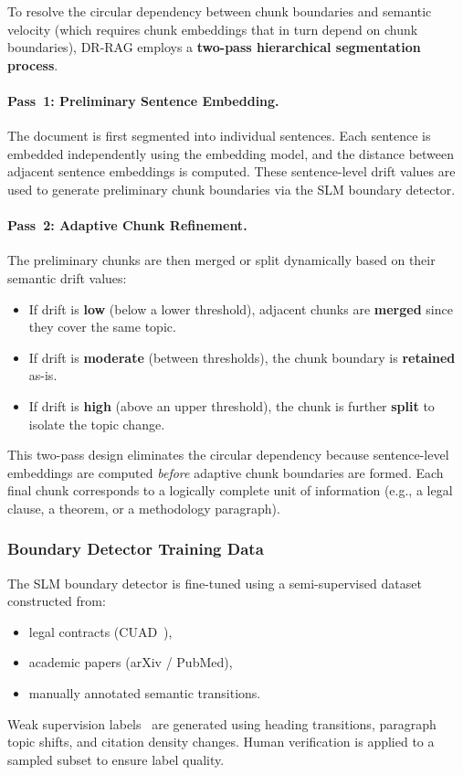 \documentclass[12pt,a4paper]{article}
\begin{document}
To resolve the circular dependency between chunk boundaries and semantic
velocity (which requires chunk embeddings that in turn depend on chunk
boundaries), DR-RAG employs a \textbf{two-pass hierarchical segmentation
process}.

\paragraph{Pass~1: Preliminary Sentence Embedding.}
The document is first segmented into individual sentences. Each sentence is
embedded independently using the embedding model, and the distance between
adjacent sentence embeddings is computed. These sentence-level drift values
are used to generate preliminary chunk boundaries via the SLM boundary
detector.

\paragraph{Pass~2: Adaptive Chunk Refinement.}
The preliminary chunks are then merged or split dynamically based on their
semantic drift values:
\begin{itemize}
  \item If drift is \textbf{low} (below a lower threshold), adjacent chunks
    are \textbf{merged} since they cover the same topic.
  \item If drift is \textbf{moderate} (between thresholds), the chunk
    boundary is \textbf{retained} as-is.
  \item If drift is \textbf{high} (above an upper threshold), the chunk is
    further \textbf{split} to isolate the topic change.
\end{itemize}
This two-pass design eliminates the circular dependency because sentence-level
embeddings are computed \emph{before} adaptive chunk boundaries are formed.
Each final chunk corresponds to a logically complete unit of information
(e.g., a legal clause, a theorem, or a methodology paragraph).

\subsubsection{Boundary Detector Training Data}

The SLM boundary detector is fine-tuned using a semi-supervised dataset
constructed from:
\begin{itemize}
  \item legal contracts (CUAD~\cite{hendrycks2021cuad}),
  \item academic papers (arXiv / PubMed),
  \item manually annotated semantic transitions.
\end{itemize}
Weak supervision labels~\cite{ratner2017snorkel} are generated using heading
transitions, paragraph topic shifts, and citation density changes. Human
verification is applied to a sampled subset to ensure label quality.
\end{document}
